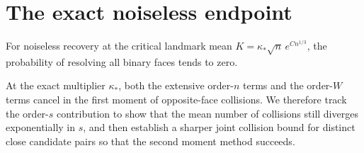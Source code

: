 \section{The exact noiseless endpoint}\label{sec:noiseless-exact}
\begin{theorem}\label{thm:noiseless-exact}
For noiseless recovery at the critical landmark mean \(K=\kappa_*\sqrt n\,e^{C n^{1/3}}\), the probability of resolving all binary faces tends to zero.
\end{theorem}

At the exact multiplier \(\kappa_*\), both the extensive order-\(n\) terms and the order-\(W\) terms cancel in the first moment of opposite-face collisions. We therefore track the order-\(s\) contribution to show that the mean number of collisions still diverges exponentially in \(s\), and then establish a sharper joint collision bound for distinct close candidate pairs so that the second moment method succeeds.

